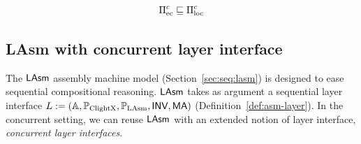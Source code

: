 \begin{lemma}
\[\Pi_{\text{ec}}^c \sqsubseteq
\Pi_{\text{loc}}^{c}\]

\end{lemma}




\subsection{LAsm with concurrent layer interface}
\label{sec:con:lasm}




The $\mathsf{LAsm}$ assembly machine model (\cf Section~\ref{sec:seq:lasm}) is
designed to ease sequential compositional reasoning. $\mathsf{LAsm}$ takes as
argument a sequential layer interface $L := (\mathbb{A}, \mathbb{P}_{\mathrm{ClightX}}, \mathbb{P}_{\mathrm{LAsm}}, \textsf{INV}, \textsf{MA})$
(\cf Definition~\ref{def:asm-layer}).
In the concurrent setting, we can reuse $\mathsf{LAsm}$ with an extended
notion of layer interface, \emph{concurrent layer interfaces}.

